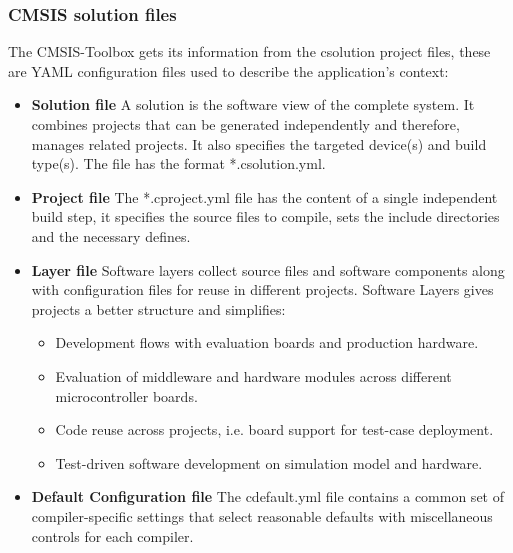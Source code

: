 \subsubsection{CMSIS solution files}
The CMSIS-Toolbox gets its information from the csolution project files, these are YAML configuration files used to describe the application's context:
\begin{itemize}
    \item \textbf{Solution file} A solution is the software view of the complete system. It combines projects that can be generated independently and therefore, manages related projects. It also specifies the targeted device(s) and build type(s). The file has the format *.csolution.yml.
    \item \textbf{Project file} The *.cproject.yml file has the content of a single independent build step, it specifies the source files to compile, sets the include directories and the necessary defines.
    \item \textbf{Layer file} Software layers collect source files and software components along with configuration files for reuse in different projects. Software Layers gives projects a better structure and simplifies:
    \begin{itemize}
        \item Development flows with evaluation boards and production hardware.
        \item Evaluation of middleware and hardware modules across different microcontroller boards.
        \item Code reuse across projects, i.e. board support for test-case deployment.
        \item Test-driven software development on simulation model and hardware.
    \end{itemize}
    \item \textbf{Default Configuration file} The cdefault.yml file contains a common set of compiler-specific settings that select reasonable defaults with miscellaneous controls for each compiler. 
\end{itemize}
